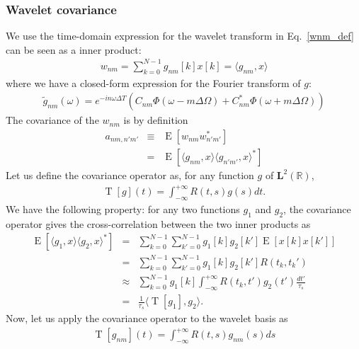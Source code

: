 \documentclass{article}
\begin{document}
\subsubsection{Wavelet covariance}
We use the time-domain expression for the wavelet transform in Eq.~\eqref{wnm_def} can be seen as a inner product:
\begin{eqnarray}
    w_{n m} = \sum_{k=0}^{N-1} g_{nm}[k] x[k] = \langle g_{nm}, x \rangle
\end{eqnarray}
where we have a closed-form expression for the Fourier transform of $g$:
\begin{eqnarray}
\label{eq:gnm_tilde}
\tilde{g}_{n m}(\omega)= e^{-i n \omega \Delta T}  \left(C_{n m} \Phi(\omega-m \Delta \Omega) +C_{n m}^* \Phi(\omega+m \Delta \Omega)\right)
\end{eqnarray}
The covariance of the $w_{nm}$ is by definition
\begin{eqnarray}
    a_{nm, n'm'} & \equiv & \operatorname{E}\left[w_{n m} w_{n' m'}^{\ast}\right] \nonumber \\
    & = & \operatorname{E}\left[ \langle g_{n m} , x \rangle \langle g_{n' m'}, x \rangle^{\ast} \right]
\end{eqnarray}
Let us define the covariance operator as, for any function $g$ of $\mathbf{L}^{2}(\mathbb{R})$,
\begin{eqnarray}
    \operatorname{T}[g](t) = \int_{-\infty}^{+\infty} R(t, s) g(s) dt .
\end{eqnarray}
We have the following property: for any two functions $g_1$ and $g_2$, the covariance operator gives the cross-correlation between the two inner products as
\begin{eqnarray}
\label{eq:cov_operator_property}
    \operatorname{E}\left[ \langle g_{1} , x \rangle \langle g_{2}, x \rangle^{\ast} \right] & = & \sum_{k=0}^{N-1}\sum_{k'=0}^{N-1} g_{1}[k] g_{2}[k'] \operatorname{E}\left[ x[k] x[k'] \right] \nonumber \\
    & = & \sum_{k=0}^{N-1}\sum_{k'=0}^{N-1} g_{1}[k] g_{2}[k'] R(t_k, t_k') \nonumber \\
    & \approx & \sum_{k=0}^{N-1} g_{1}[k]  \int_{-\infty}^{+\infty}  R(t_k, t') g_{2}(t') \frac{dt'}{\tau_s} \nonumber \\
    & = & \frac{1}{\tau_s} \langle \operatorname{T}[g_1], g_2 \rangle .
\end{eqnarray}
Now, let us apply the covariance operator to the wavelet basis as
\begin{eqnarray}
    \operatorname{T}[g_{nm}](t) = \int_{-\infty}^{+\infty} R(t, s) g_{nm}(s) ds
\end{eqnarray}
\end{document}
